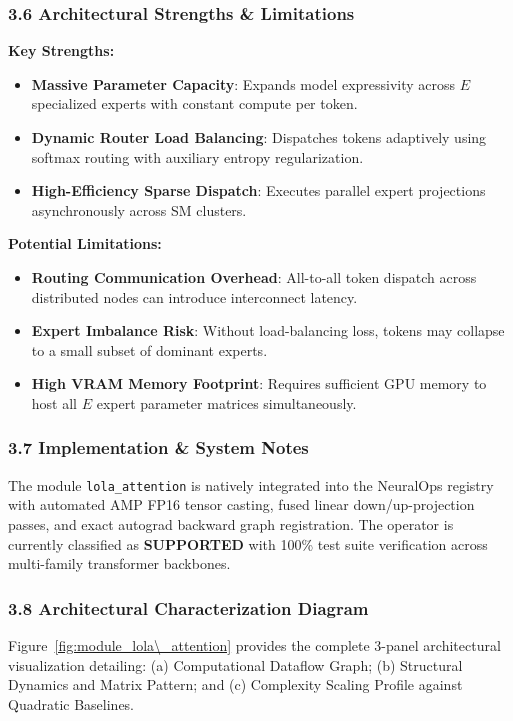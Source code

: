\subsubsection*{3.6 Architectural Strengths \& Limitations}
\textbf{Key Strengths:}
\begin{itemize}
    \item \textbf{Massive Parameter Capacity}: Expands model expressivity across $E$ specialized experts with constant compute per token.
    \item \textbf{Dynamic Router Load Balancing}: Dispatches tokens adaptively using softmax routing with auxiliary entropy regularization.
    \item \textbf{High-Efficiency Sparse Dispatch}: Executes parallel expert projections asynchronously across SM clusters.
\end{itemize}

\textbf{Potential Limitations:}
\begin{itemize}
    \item \textbf{Routing Communication Overhead}: All-to-all token dispatch across distributed nodes can introduce interconnect latency.
    \item \textbf{Expert Imbalance Risk}: Without load-balancing loss, tokens may collapse to a small subset of dominant experts.
    \item \textbf{High VRAM Memory Footprint}: Requires sufficient GPU memory to host all $E$ expert parameter matrices simultaneously.
\end{itemize}

\subsubsection*{3.7 Implementation \& System Notes}
The module \texttt{lola\_attention} is natively integrated into the NeuralOps registry with automated AMP FP16 tensor casting, fused linear down/up-projection passes, and exact autograd backward graph registration. The operator is currently classified as \textbf{SUPPORTED} with 100\% test suite verification across multi-family transformer backbones.

\subsubsection*{3.8 Architectural Characterization Diagram}
Figure~\ref{fig:module_lola\_attention} provides the complete 3-panel architectural visualization detailing: (a) Computational Dataflow Graph; (b) Structural Dynamics and Matrix Pattern; and (c) Complexity Scaling Profile against Quadratic Baselines.

